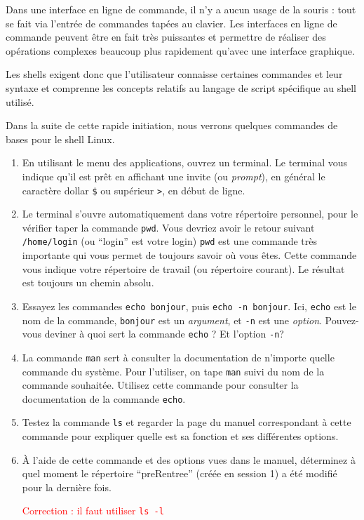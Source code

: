 \documentclass{article}
\begin{document}
Dans une interface en ligne de commande, il n’y a aucun usage de la souris : tout se fait via l’entrée de commandes tapées au clavier. Les interfaces en ligne de commande peuvent être en fait très puissantes et permettre de réaliser des opérations complexes beaucoup plus rapidement qu’avec une interface graphique.

Les shells exigent donc que l’utilisateur connaisse certaines commandes et leur syntaxe et comprenne les concepts relatifs au langage de script spécifique au shell utilisé.

Dans la suite de cette rapide initiation, nous verrons quelques commandes de bases pour le shell Linux. 

\begin{exercice}

\begin{enumerate}
\def\labelenumi{\arabic{enumi}.}
\item
  En utilisant le menu des applications, ouvrez un terminal. Le terminal
  vous indique qu'il est prêt en affichant une invite (ou
  \emph{prompt}), en général le caractère dollar \texttt{\$} ou
  supérieur \texttt{\textgreater{}}, en début de ligne.  
\item
Le terminal s'ouvre automatiquement dans votre répertoire personnel, pour le vérifier taper la commande \texttt{pwd}. 
Vous devriez avoir le retour suivant \texttt{/home/login} (ou ``login'' est votre login)
\texttt{pwd} est une commande très importante qui vous permet de toujours savoir où vous êtes. Cette commande vous indique votre répertoire de travail (ou répertoire courant). 
Le résultat est toujours un chemin absolu.
\item
  Essayez les commandes \texttt{echo\ bonjour}, puis
  \texttt{echo\ -n\ bonjour}. Ici, \texttt{echo} est le nom de la
  commande, \texttt{bonjour} est un \emph{argument}, et \texttt{-n} est
  une \emph{option}. Pouvez-vous deviner à quoi sert la commande
  \texttt{echo} ? Et l'option \texttt{-n}?
\item
  La commande \texttt{man} sert à consulter la documentation de
  n'importe quelle commande du système. Pour l'utiliser, on tape
  \texttt{man} suivi du nom de la commande souhaitée. Utilisez cette
  commande pour consulter la documentation de la commande \texttt{echo}.
\item
  Testez la commande \texttt{ls} et regarder la page du manuel
  correspondant à cette commande pour expliquer quelle est sa fonction et ses différentes options.
\item
  À l'aide de cette commande et des options vues dans le manuel, déterminez à quel moment le répertoire
  ``preRentree''  (créée en session 1) a été modifié pour la dernière fois.
 
\textcolor{red}{Correction : il faut utiliser \texttt{ls -l}}
 
\end{enumerate}
\end{exercice}
\end{document}
